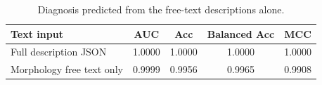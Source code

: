 \begin{table}[t]
\centering
\caption{Diagnosis predicted from the free-text descriptions alone.}
\label{tab:text}
\begin{tabular}{lcccc}
\toprule
Text input & AUC & Acc & Balanced Acc & MCC \\
\midrule
Full description JSON & 1.0000 & 1.0000 & 1.0000 & 1.0000 \\
Morphology free text only & 0.9999 & 0.9956 & 0.9965 & 0.9908 \\
\bottomrule
\end{tabular}
\end{table}